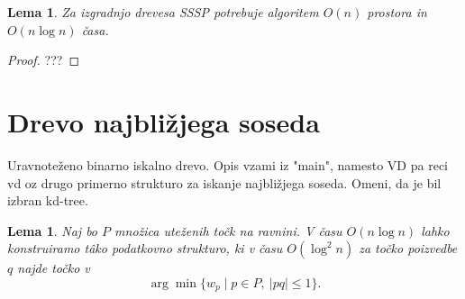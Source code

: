 \documentclass[a4paper, 12pt]{book}
\newtheorem{lema}[izrek]{Lema}
\begin{document}
\begin{lema}
Za izgradnjo drevesa SSSP potrebuje algoritem $O(n)$ prostora in $O(n\log n)$ časa.
\end{lema}

\begin{proof}
???
\end{proof}


\section{Drevo najbližjega soseda}

Uravnoteženo binarno iskalno drevo. Opis vzami iz "main", namesto VD pa reci vd oz drugo primerno strukturo za iskanje najbližjega soseda. Omeni, da je bil izbran kd-tree.

\begin{lema}
\label{le:ds2}
    Naj bo $P$ množica uteženih točk na ravnini. V času $O(n\log n)$ lahko konstruiramo t\^{a}ko podatkovno strukturo, ki v času $O(\log^2 n)$ za točko poizvedbe $q$ najde točko v 
	\[	\arg\min \{ w_p \mid p\in P,~|pq|\le 1\}.
	\]
\end{lema}
\end{document}
